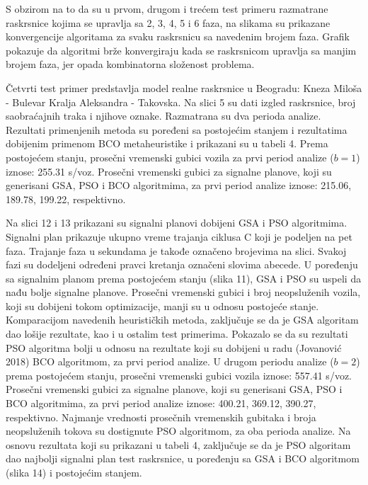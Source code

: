 
S obzirom na to da su u prvom, drugom i trećem test primeru razmatrane raskrsnice kojima se upravlja sa 2, 3, 4, 5 i 6 faza, na slikama su prikazane konvergencije algoritama za svaku raskrsnicu sa navedenim brojem faza. Grafik pokazuje da algoritmi brže konvergiraju kada se raskrsnicom upravlja sa manjim brojem faza, jer opada kombinatorna složenost problema.

Četvrti test primer predstavlja model realne raskrsnice u Beogradu: Kneza Miloša - Bulevar Kralja Aleksandra - Takovska. Na slici 5 su dati izgled raskrsnice, broj saobraćajnih traka i njihove oznake. Razmatrana su dva perioda analize. Rezultati primenjenih metoda su poređeni sa postojećim stanjem i rezultatima dobijenim primenom BCO metaheuristike i prikazani su u tabeli 4. Prema postojećem stanju, prosečni vremenski gubici vozila za prvi period analize ($b=1$) iznose: 255.31 s/voz. Prosečni vremenski gubici za signalne planove, koji su generisani GSA, PSO i BCO algoritmima, za prvi period analize iznose: 215.06, 189.78, 199.22, respektivno. 

Na slici 12 i 13 prikazani su signalni planovi dobijeni GSA i PSO algoritmima. Signalni plan prikazuje ukupno vreme trajanja ciklusa C koji je podeljen na pet faza. Trajanje faza u sekundama je takođe označeno brojevima na slici. Svakoj fazi su dodeljeni određeni pravci kretanja označeni slovima abecede. U poređenju sa signalnim planom prema postojećem stanju (slika 11), GSA i PSO su uspeli da nađu bolje signalne planove. Prosečni vremenski gubici i broj neopsluženih vozila, koji su dobijeni tokom optimizacije, manji su u odnosu postojeće stanje. Komparacijom navedenih heurističkih metoda, zaključuje se da je GSA algoritam dao lošije rezultate, kao i u ostalim test primerima. Pokazalo se da su rezultati PSO algoritma bolji u odnosu na rezultate koji su dobijeni u radu (Jovanović 2018) BCO algoritmom, za prvi period analize.  
U drugom periodu analize ($b=2$) prema postojećem stanju, prosečni vremenski gubici vozila iznose: 557.41 s/voz. Prosečni vremenski gubici za signalne planove, koji su generisani GSA, PSO i BCO algoritmima, za prvi period analize iznose: 400.21, 369.12, 390.27, respektivno. Najmanje vrednosti prosečnih vremenskih gubitaka i broja neopsluženih tokova su dostignute PSO algoritmom, za oba perioda analize. Na osnovu rezultata koji su prikazani u tabeli 4, zaključuje se da je PSO algoritam dao najbolji signalni plan test raskrsnice, u poređenju sa GSA i BCO algoritmom (slika 14) i postojećim stanjem.


